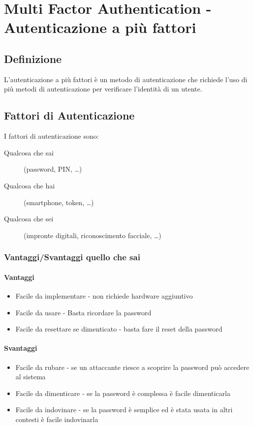 \section{Multi Factor Authentication - Autenticazione a più fattori}
\label{sec:mfa}
    \subsection{Definizione}
        L'autenticazione a più fattori è un metodo di autenticazione che richiede l'uso di più metodi di autenticazione per verificare l'identità di un utente.
    \subsection{Fattori di Autenticazione}
        I fattori di autenticazione sono:
        \begin{description}
            \item[Qualcosa che sai] (password, PIN, \dots)
            \item[Qualcosa che hai] (smartphone, token, \dots)
            \item[Qualcosa che sei] (impronte digitali, riconoscimento facciale, \dots)
        \end{description}
        \subsubsection{Vantaggi/Svantaggi quello che sai}
            \paragraph{Vantaggi}
                \begin{itemize}
                    \item Facile da implementare - non richiede hardware aggiuntivo
                    \item Facile da usare - Basta ricordare la password
                    \item Facile da resettare se dimenticato - basta fare il reset della password
                \end{itemize}
            \paragraph{Svantaggi}
                \begin{itemize}
                    \item Facile da rubare - se un attaccante riesce a scoprire la password può accedere al sistema 
                    \item Facile da dimenticare - se la password è complessa è facile dimenticarla
                    \item Facile da indovinare - se la password è semplice ed è stata usata in altri contesti è facile indovinarla
                \end{itemize}
